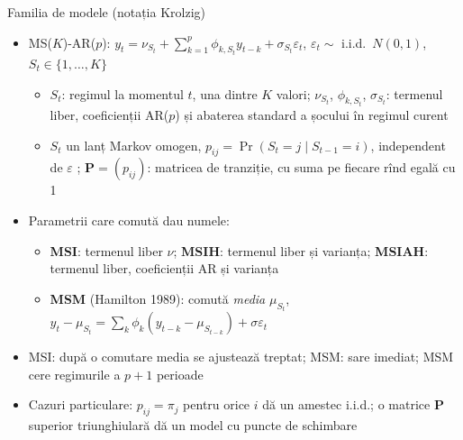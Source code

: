 \begin{frame}{Familia de modele (notația Krolzig)}
\itemsize{\small}
\begin{itemize}
    \item MS($K$)-AR($p$): $y_t = \nu_{S_t} + \sum_{k=1}^p \phi_{k,S_t} y_{t-k} + \sigma_{S_t}\varepsilon_t$, $\varepsilon_t \sim$ i.i.d.\ $N(0, 1)$, $S_t \in \{1, \dots, K\}$
    \begin{itemize}
        \item $S_t$: regimul la momentul $t$, una dintre $K$ valori; $\nu_{S_t}$, $\phi_{k,S_t}$, $\sigma_{S_t}$: termenul liber, coeficienții AR($p$) și abaterea standard a șocului în regimul curent
        \item $S_t$ un lanț Markov omogen, $p_{ij} = \Pr(S_t = j \mid S_{t-1} = i)$, independent de $\varepsilon$ ; $\mathbf{P} = (p_{ij})$: matricea de tranziție, cu suma pe fiecare rînd egală cu 1
    \end{itemize}
    \item Parametrii care comută dau numele:
    \begin{itemize}
        \item \textbf{MSI}: termenul liber $\nu$; \textbf{MSIH}: termenul liber și varianța; \textbf{MSIAH}: termenul liber, coeficienții AR și varianța
        \item \textbf{MSM} (Hamilton 1989): comută \emph{media} $\mu_{S_t}$, $y_t - \mu_{S_t} = \sum_k \phi_k(y_{t-k} - \mu_{S_{t-k}}) + \sigma\varepsilon_t$
    \end{itemize}
    \item MSI: după o comutare media se ajustează treptat; MSM: sare imediat; MSM cere regimurile a $p + 1$ perioade
    \item Cazuri particulare: $p_{ij} = \pi_j$ pentru orice $i$ dă un amestec i.i.d.; o matrice $\mathbf{P}$ superior triunghiulară dă un model cu puncte de schimbare 
\end{itemize}
\end{frame}

